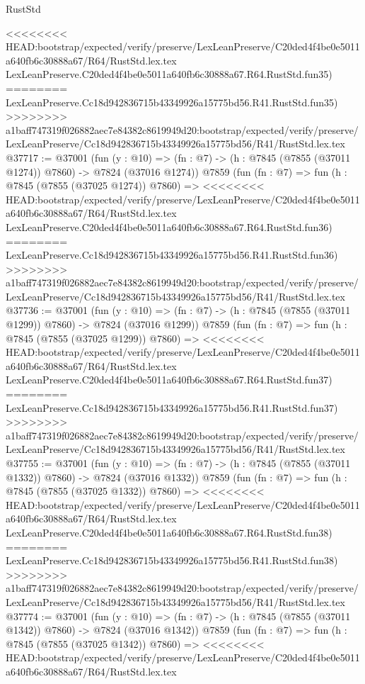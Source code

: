 \begin{lexlean}{RustStd}
\begin{coremodule}
{\begin{coremodule}
{{{{{{{{{{{{{{{{{{{{{{{{{{{{{{{{{{{{{{{{{{{{{{{{{{{{{{<<<<<<<< HEAD:bootstrap/expected/verify/preserve/LexLeanPreserve/C20ded4f4be0e5011a640fb6c30888a67/R64/RustStd.lex.tex
    LexLeanPreserve.C20ded4f4be0e5011a640fb6c30888a67.R64.RustStd.fun35)
========
    LexLeanPreserve.Cc18d942836715b43349926a15775bd56.R41.RustStd.fun35)
>>>>>>>> a1baff747319f026882aec7e84382c8619949d20:bootstrap/expected/verify/preserve/LexLeanPreserve/Cc18d942836715b43349926a15775bd56/R41/RustStd.lex.tex
@37717 := @37001
    (fun (y : @10) => (fn : @7) -> (h : @7845 (@7855 (@37011 @1274)) @7860) -> @7824 (@37016 @1274))
    @7859
    (fun (fn : @7) =>
    fun (h : @7845 (@7855 (@37025 @1274)) @7860) =>
<<<<<<<< HEAD:bootstrap/expected/verify/preserve/LexLeanPreserve/C20ded4f4be0e5011a640fb6c30888a67/R64/RustStd.lex.tex
    LexLeanPreserve.C20ded4f4be0e5011a640fb6c30888a67.R64.RustStd.fun36)
========
    LexLeanPreserve.Cc18d942836715b43349926a15775bd56.R41.RustStd.fun36)
>>>>>>>> a1baff747319f026882aec7e84382c8619949d20:bootstrap/expected/verify/preserve/LexLeanPreserve/Cc18d942836715b43349926a15775bd56/R41/RustStd.lex.tex
@37736 := @37001
    (fun (y : @10) => (fn : @7) -> (h : @7845 (@7855 (@37011 @1299)) @7860) -> @7824 (@37016 @1299))
    @7859
    (fun (fn : @7) =>
    fun (h : @7845 (@7855 (@37025 @1299)) @7860) =>
<<<<<<<< HEAD:bootstrap/expected/verify/preserve/LexLeanPreserve/C20ded4f4be0e5011a640fb6c30888a67/R64/RustStd.lex.tex
    LexLeanPreserve.C20ded4f4be0e5011a640fb6c30888a67.R64.RustStd.fun37)
========
    LexLeanPreserve.Cc18d942836715b43349926a15775bd56.R41.RustStd.fun37)
>>>>>>>> a1baff747319f026882aec7e84382c8619949d20:bootstrap/expected/verify/preserve/LexLeanPreserve/Cc18d942836715b43349926a15775bd56/R41/RustStd.lex.tex
@37755 := @37001
    (fun (y : @10) => (fn : @7) -> (h : @7845 (@7855 (@37011 @1332)) @7860) -> @7824 (@37016 @1332))
    @7859
    (fun (fn : @7) =>
    fun (h : @7845 (@7855 (@37025 @1332)) @7860) =>
<<<<<<<< HEAD:bootstrap/expected/verify/preserve/LexLeanPreserve/C20ded4f4be0e5011a640fb6c30888a67/R64/RustStd.lex.tex
    LexLeanPreserve.C20ded4f4be0e5011a640fb6c30888a67.R64.RustStd.fun38)
========
    LexLeanPreserve.Cc18d942836715b43349926a15775bd56.R41.RustStd.fun38)
>>>>>>>> a1baff747319f026882aec7e84382c8619949d20:bootstrap/expected/verify/preserve/LexLeanPreserve/Cc18d942836715b43349926a15775bd56/R41/RustStd.lex.tex
@37774 := @37001
    (fun (y : @10) => (fn : @7) -> (h : @7845 (@7855 (@37011 @1342)) @7860) -> @7824 (@37016 @1342))
    @7859
    (fun (fn : @7) =>
    fun (h : @7845 (@7855 (@37025 @1342)) @7860) =>
<<<<<<<< HEAD:bootstrap/expected/verify/preserve/LexLeanPreserve/C20ded4f4be0e5011a640fb6c30888a67/R64/RustStd.lex.tex
}}}}}}}}}}}}}}}}}}}}}}}}}}}}}}}}}}}}}}}}}}}}}}}}}}}}}}
\end{coremodule}}
\end{coremodule}
\end{lexlean}
